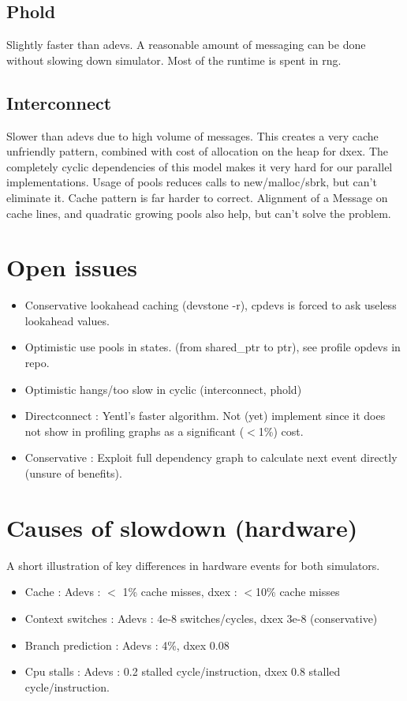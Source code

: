 \documentclass[]{article}
\begin{document}
\subsection{Phold}
Slightly faster than adevs. A reasonable amount of messaging can be done without slowing down simulator. Most of the runtime is spent in rng.
\subsection{Interconnect}
Slower than adevs due to high volume of messages. This creates a very cache unfriendly pattern, combined with cost of allocation on the heap for dxex. 
The completely cyclic dependencies of this model makes it very hard for our parallel implementations. Usage of pools reduces calls to new/malloc/sbrk, but can't eliminate it. Cache pattern is far harder to correct. Alignment of a Message on cache lines, and quadratic growing pools also help, but can't solve the problem.
\section{Open issues}
\begin{itemize}
	\item Conservative lookahead caching (devstone -r), cpdevs is forced to ask useless lookahead values.
	\item Optimistic use pools in states. (from shared\_ptr to ptr), see profile opdevs in repo.
	\item Optimistic hangs/too slow in cyclic (interconnect, phold)
	\item Directconnect : Yentl's faster algorithm. Not (yet) implement since it does not show in profiling graphs as a significant ($<$1\%) cost.
	\item Conservative : Exploit full dependency graph to calculate next event directly (unsure of benefits).
\end{itemize}
\section{Causes of slowdown (hardware)}
A short illustration of key differences in hardware events for both simulators.
\begin{itemize}
	\item Cache : Adevs : $<$ 1\% cache misses, dxex : $<$10\% cache misses
	\item Context switches : Adevs : 4e-8 switches/cycles, dxex 3e-8 (conservative)
	\item Branch prediction : Adevs : 4\%, dxex 0.08%
	\item Cpu stalls : Adevs : 0.2 stalled cycle/instruction, dxex 0.8 stalled cycle/instruction.
\end{itemize}
\end{document}

